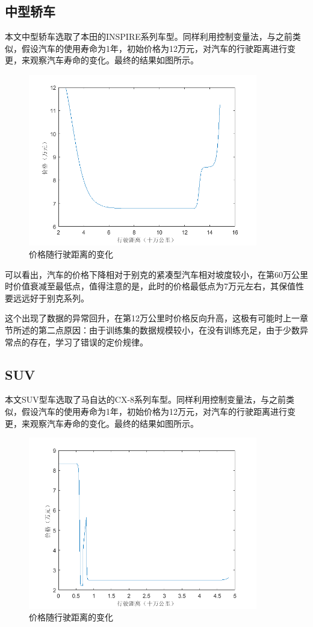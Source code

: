 \documentclass{ctexart}
\newcounter{sub}
\begin{document}
\subsection{中型轿车}
本文中型轿车选取了本田的INSPIRE系列车型。同样利用控制变量法，与之前类似，假设汽车的使用寿命为1年，初始价格为12万元，对汽车的行驶距离进行变更，来观察汽车寿命的变化。最终的结果如图所示。
\renewcommand\figurename{图}
\begin{figure}[H]
	\centering
	\includegraphics[width=10cm]{two.png}
	\caption{价格随行驶距离的变化} \label{all}
\end{figure}

可以看出，汽车的价格下降相对于别克的紧凑型汽车相对坡度较小，在第60万公里时价值衰减至最低点，值得注意的是，此时的价格最低点为7万元左右，其保值性要远远好于别克系列。

这个出现了数据的异常回升，在第12万公里时价格反向升高，这极有可能时上一章节所述的第二点原因：由于训练集的数据规模较小，在没有训练充足，由于少数异常点的存在，学习了错误的定价规律。

\subsection{SUV}

本文SUV型车选取了马自达的CX-8系列车型。同样利用控制变量法，与之前类似，假设汽车的使用寿命为1年，初始价格为12万元，对汽车的行驶距离进行变更，来观察汽车寿命的变化。最终的结果如图所示。
\renewcommand\figurename{图}
\begin{figure}[H]
	\centering
	\includegraphics[width=10cm]{three.png}
	\caption{价格随行驶距离的变化} \label{all}
\end{figure}
\end{document}
